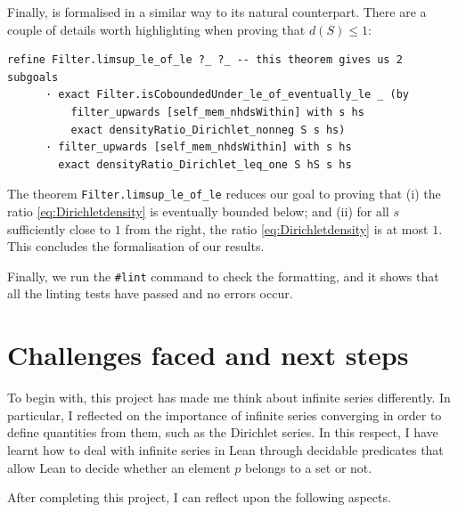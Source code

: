 \documentclass[a4paper,11pt]{article}
\theoremstyle{plain}
\begin{document}
    Finally,  is formalised in a similar way to its natural counterpart. There are a couple of details worth highlighting when proving that $d(S)\leq 1$:\\
    \begin{lstlisting}[caption={(Part of) the proof that $d(S)\leq 1$.}, label={list:9}]
    refine Filter.limsup_le_of_le ?_ ?_ -- this theorem gives us 2 subgoals
      · exact Filter.isCoboundedUnder_le_of_eventually_le _ (by
          filter_upwards [self_mem_nhdsWithin] with s hs
          exact densityRatio_Dirichlet_nonneg S s hs)
      · filter_upwards [self_mem_nhdsWithin] with s hs
        exact densityRatio_Dirichlet_leq_one S hS s hs
	\end{lstlisting}
    The theorem \lstinline|Filter.limsup_le_of_le| reduces our goal to proving that (i) the ratio \eqref{eq:Dirichletdensity} is eventually bounded below; and (ii) for all $s$ sufficiently close to $1$ from the right, the ratio \eqref{eq:Dirichletdensity} is at most $1$. This concludes the formalisation of our results.

	Finally, we run the \lstinline|#lint| command to check the formatting, and it shows that all the linting tests have passed and no errors occur.

	\section{Challenges faced and next steps}\label{sec:challenges}

	To begin with, this project has made me think about infinite series differently. In particular, I reflected on the importance of infinite series converging in order to define quantities from them, such as the Dirichlet series. In this respect, I have learnt how to deal with infinite series in Lean through decidable predicates that allow Lean to decide whether an element $p$ belongs to a set or not.

	After completing this project, I can reflect upon the following aspects.
\end{document}
